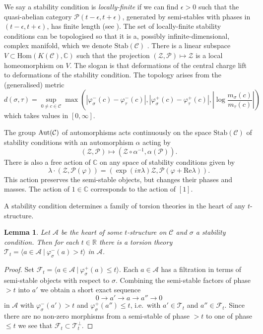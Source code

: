 \documentclass{article}
\theoremstyle{plain}
\newtheorem{lemma}[theorem]{Lemma}     %
\theoremstyle{definition}
\theoremstyle{remark}
\newcommand{\defn}[1]{\emph{#1}}
\newcommand{\ie}{i.e.\ }
\newcommand{\R}{\mathbb{R}}
\newcommand{\C}{\mathbb{C}}
\newcommand{\cat}[1]{\mathcal{#1}}
\newcommand{\mor}[2]{{\mathrm{Hom}}(#1,#2)}
\newcommand{\stab}[1]{\mathrm{Stab}(#1)}
\begin{document}
We say a stability condition is \defn{locally-finite} if we can find $\epsilon >0$ such that the quasi-abelian category $\mathcal{P}(t-\epsilon, t+\epsilon)$, generated by semi-stables with phases in $(t-\epsilon, t+\epsilon)$, has finite length (see \cite[Definition 5.7]{MR2373143}). The set of locally-finite stability conditions can be topologised so that it is a, possibly infinite-dimensional, complex manifold, which we denote $\stab{\cat{C}}$ \cite[Theorem 1.2]{MR2373143}. There is a linear subspace $V \subset \mor{K(\cat{C})}{\C}$ such that the projection $(\mathcal{Z}, \mathcal{P}) \mapsto \mathcal{Z}$ is a local homeomorphism on $V$. The slogan is that deformations of the central charge lift to deformations of the stability condition. The topology arises from the (generalised) metric
$$
d(\sigma,\tau) = \sup_{0\neq c \in \cat{C}} \max\left( | \varphi_\sigma^-(c) - \varphi_\tau^-(c)| , | \varphi_\sigma^+(c) - \varphi_\tau^+(c)|, \left| \log \frac{m_\sigma(c)}{m_\tau(c)}\right| \right) 
$$
which takes values in $[0,\infty]$. 


The group ${\rm Aut}(\cat{C})$ of automorphisms acts continuously on the space $\stab{\cat{C}}$ of stability conditions with an automorphism $\alpha$ acting by
$$
(\mathcal{Z}, \mathcal{P}) \mapsto \left(\mathcal{Z}\circ \alpha^{-1}, \alpha(\mathcal{P})\right).
$$
\label{c action} There is also a free action of $\C$ on any space of stability conditions given by 
$$
\lambda \cdot \left(\mathcal{Z},\mathcal{P}(\varphi) \right) = \left( \exp(i\pi\lambda)\mathcal{Z} , \mathcal{P}(\varphi + \mathrm{Re} \lambda) \right).
$$
This action preserves the semi-stable objects, but changes their phases and masses. The action of $1\in \C$ corresponds to the action of $[1]$. 

A stability condition determines a family of torsion theories in the heart of any $t$-structure.
\begin{lemma}
\label{stab-fam-tor}
Let $\cat{A}$ be the heart of some $t$-structure on $\cat{C}$ and $\sigma$ a stability condition. Then for each $t\in\R$ there is a torsion theory $\cat{T}_t = \langle  a \in \cat{A} \ |\ \varphi_\sigma^-(a) > t \rangle$ in $\cat{A}$.
\end{lemma}
\begin{proof}
Set $\cat{F}_t = \langle a \in \cat{A}\ |\ \varphi_\sigma^+(a) \leq t \rangle$. Each $a\in \cat{A}$ has a filtration in terms of semi-stable objects with respect to $\sigma$. Combining the semi-stable factors of phase $>t$ into $a'$ we obtain a short exact sequence
$$
0\to a' \to a\to a'' \to 0
$$
 in $\cat{A}$ with $\varphi^-_\sigma(a') > t$ and $\varphi^+_\sigma(a'')\leq t$, \ie with $a'\in \cat{T}_t$ and $a''\in \cat{F}_t$. Since there are no non-zero morphisms from a semi-stable of phase $>t$ to one of phase $\leq t$ we see that $\cat{F}_t \subset  \cat{T}_t^\perp$. 
\end{proof}
\end{document}

